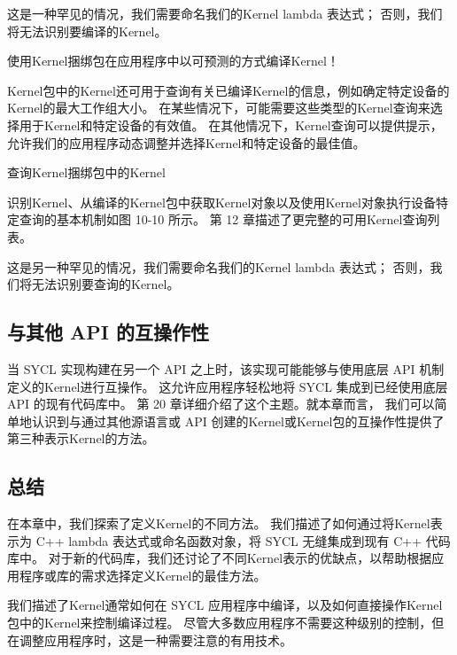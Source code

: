 这是一种罕见的情况，我们需要命名我们的Kernel lambda 表达式； 否则，我们将无法识别要编译的Kernel。

\begin{remark}
	使用Kernel捆绑包在应用程序中以可预测的方式编译Kernel！
\end{remark}

Kernel包中的Kernel还可用于查询有关已编译Kernel的信息，例如确定特定设备的Kernel的最大工作组大小。 
在某些情况下，可能需要这些类型的Kernel查询来选择用于Kernel和特定设备的有效值。 
在其他情况下，Kernel查询可以提供提示，允许我们的应用程序动态调整并选择Kernel和特定设备的最佳值。

{\color{red} 查询Kernel捆绑包中的Kernel}

识别Kernel、从编译的Kernel包中获取Kernel对象以及使用Kernel对象执行设备特定查询的基本机制如图 10-10 所示。 
第 12 章描述了更完整的可用Kernel查询列表。

这是另一种罕见的情况，我们需要命名我们的Kernel lambda 表达式； 否则，我们将无法识别要查询的Kernel。

\subsection{与其他 API 的互操作性}
当 SYCL 实现构建在另一个 API 之上时，该实现可能能够与使用底层 API 机制定义的Kernel进行互操作。 
这允许应用程序轻松地将 SYCL 集成到已经使用底层 API 的现有代码库中。 
第 20 章详细介绍了这个主题。就本章而言，
我们可以简单地认识到与通过其他源语言或 API 创建的Kernel或Kernel包的互操作性提供了第三种表示Kernel的方法。

\subsection{总结}
在本章中，我们探索了定义Kernel的不同方法。 
我们描述了如何通过将Kernel表示为 C++ lambda 表达式或命名函数对象，将 SYCL 无缝集成到现有 C++ 代码库中。 
对于新的代码库，我们还讨论了不同Kernel表示的优缺点，以帮助根据应用程序或库的需求选择定义Kernel的最佳方法。

我们描述了Kernel通常如何在 SYCL 应用程序中编译，以及如何直接操作Kernel包中的Kernel来控制编译过程。 
尽管大多数应用程序不需要这种级别的控制，但在调整应用程序时，这是一种需要注意的有用技术。